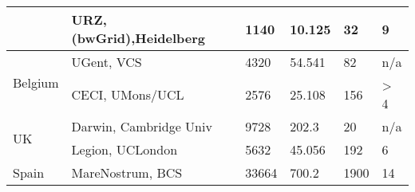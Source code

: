 \begin{tabular}{|l|l||l|l|l|l|}
                       &        URZ, {\tiny (bwGrid)},Heidelberg & 1140        & 10.125       & 32                & 9 \\
  \hline\hline
  \multirow{2}{*}{Belgium} & UGent, VCS           & 4320        & 54.541       & 82                & n/a \\
                       &     CECI, UMons/UCL      & 2576        & 25.108       & 156               & > 4  \\
  \hline\hline
  \multirow{2}{*}{UK}  & Darwin, Cambridge Univ   & 9728        & 202.3        & 20                & n/a \\
                       &     Legion, UCLondon     & 5632        & 45.056       & 192               & 6  \\
  \hline\hline
  Spain                & MareNostrum, BCS         & 33664       & 700.2        & 1900              & 14  \\
  \hline
\end{tabular}



%
